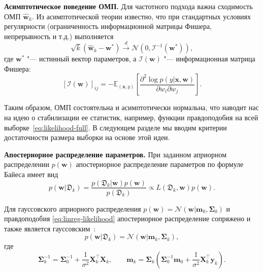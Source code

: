 \textbf{Асимптотическое поведение ОМП.} Для частотного подхода важна сходимость ОМП $\hat{\mathbf{w}}_k$. Из асимптотической теории известно, что при стандартных условиях регулярности (ограниченность информационной матрицы Фишера, непрерывность и т.\:д.) выполняется
\begin{equation}
    \sqrt{k} (\hat{\mathbf{w}}_k - \mathbf{w}^*) \xrightarrow{d} \mathcal{N}(0, \mathcal{I}^{-1}(\mathbf{w}^*)),
\end{equation}
где $\mathbf{w}^*$ "--- истинный вектор параметров, а $\mathcal{I}(\mathbf{w})$ "--- информационная матрица Фишера:
\begin{equation}
    \label{eq:fisher-information}
    \left[\mathcal{I}(\mathbf{w})\right]_{ij} = - \mathbb{E}_{(\mathbf{x}, y)}\left[ \dfrac{\partial^2 \log p(y | \mathbf{x}, \mathbf{w})}{\partial w_i \partial w_j} \right].
\end{equation}

Таким образом, ОМП состоятельна и асимптотически нормальна, что наводит нас на идею о стабилизации ее статистик, например, функции правдоподобия на всей выборке~\eqref{eq:likelihood-full}. В следующем разделе мы вводим критерии достаточности размера выборки на основе этой идеи.

\textbf{Апостериорное распределение параметров.} При заданном априорном распределении $p(\mathbf{w})$ апостериорное распределение параметров по формуле Байеса имеет вид
\begin{equation}
\label{eq:posterior}
p(\mathbf{w} | \mathfrak{D}_k) = \frac{p(\mathfrak{D}_k | \mathbf{w}) p(\mathbf{w})}{p(\mathfrak{D}_k)} \propto L(\mathfrak{D}_k, \mathbf{w}) p(\mathbf{w}).
\end{equation}

Для гауссовского априорного распределения $p(\mathbf{w}) = \mathcal{N}(\mathbf{w} | \mathbf{m}_0, \boldsymbol{\Sigma}_0)$ и правдоподобия \eqref{eq:linreg-likelihood} апостериорное распределение сопряжено и также является гауссовским~\cite{bishop2006pattern}:
\begin{equation}
    \label{eq:posterior-gaussian}
    p(\mathbf{w} | \mathfrak{D}_k) = \mathcal{N}(\mathbf{w} | \mathbf{m}_k, \boldsymbol{\Sigma}_k),
\end{equation}
где
\begin{equation}
    \boldsymbol{\Sigma}_k^{-1} = \boldsymbol{\Sigma}_0^{-1} + \frac{1}{\sigma^2} \mathbf{X}_k^\top \mathbf{X}_k, \qquad \mathbf{m}_k = \boldsymbol{\Sigma}_k \left( \boldsymbol{\Sigma}_0^{-1} \mathbf{m}_0 + \frac{1}{\sigma^2} \mathbf{X}_k^\top \mathbf{y}_k \right).
\end{equation}

